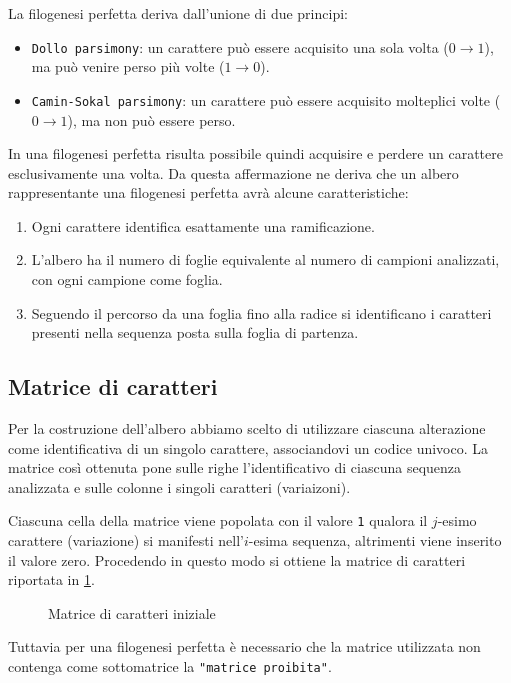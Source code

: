 \documentclass[11pt,italian]{article}
\begin{document}
\noindent
La filogenesi perfetta deriva dall'unione di due principi:
\begin{itemize}
	\item \lstinline{Dollo parsimony}: un carattere può essere acquisito una sola volta ($0 \to 1$), ma può venire perso più volte ($1 \to 0$).
	\item \lstinline{Camin-Sokal parsimony}: un carattere può essere acquisito molteplici volte ($0 \to 1$), ma non può essere perso.
\end{itemize}
In una filogenesi perfetta risulta possibile quindi acquisire e perdere un carattere esclusivamente una volta.
Da questa affermazione ne deriva che un albero rappresentante una filogenesi perfetta avrà alcune caratteristiche:
\begin{enumerate}
	\item Ogni carattere identifica esattamente una ramificazione.
	\item L'albero ha il numero di foglie equivalente al numero di campioni analizzati, con ogni campione come foglia.
	\item Seguendo il percorso da una foglia fino alla radice si identificano i caratteri presenti nella sequenza posta sulla foglia di partenza.
\end{enumerate}

\subsection{Matrice di caratteri}
Per la costruzione dell'albero abbiamo scelto di utilizzare ciascuna alterazione come identificativa di un singolo carattere, associandovi un codice univoco. La matrice così ottenuta pone sulle righe l'identificativo di ciascuna sequenza analizzata e sulle colonne i singoli caratteri (variaizoni).

Ciascuna cella della matrice viene popolata con il valore \lstinline{1} qualora il $j$-esimo carattere (variazione) si manifesti nell'$i$-esima sequenza, altrimenti viene inserito il valore zero. Procedendo in questo modo si ottiene la matrice di caratteri riportata in \cref{fig:matrix-characters}.

\begin{figure}[H]
  \caption{Matrice di caratteri iniziale}
  \label{fig:matrix-characters}
\end{figure}
\noindent
Tuttavia per una filogenesi perfetta è necessario che la matrice utilizzata non contenga come sottomatrice la \lstinline{"matrice proibita"}.
\end{document}
